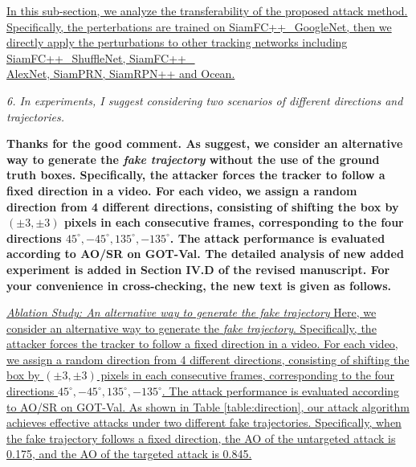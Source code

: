 \documentclass[12pt]{article}
\begin{document}
\uline{In this sub-section, we analyze the transferability of the proposed attack method. Specifically, the perterbations are trained on SiamFC++\_GoogleNet, then we directly apply the perturbations to other tracking networks including SiamFC++\_ShuffleNet, SiamFC++\_\\AlexNet, SiamPRN, SiamRPN++ and Ocean.}

\textit{6. In experiments, I suggest considering two scenarios of different directions and trajectories.}

\textbf{Thanks for the good comment. As suggest, we consider an alternative way to generate the \textit{fake trajectory} without the use of the ground truth boxes. Specifically, the attacker forces the tracker to follow a fixed direction in a video. For each video, we assign a random direction from 4 different directions, consisting of shifting the box by $(\pm 3, \pm 3)$ pixels in each consecutive frames, corresponding to the four directions $45^{\circ}, -45^{\circ}, 135^{\circ}, -135^{\circ}$.
The attack performance is evaluated according to AO/SR on GOT-Val.
The detailed analysis of new added experiment is added in Section IV.D of the revised manuscript. For your convenience in cross-checking, the new text is given as follows.}

\uline{\textit{Ablation Study: An alternative way to generate the fake trajectory} Here, we consider an alternative way to generate the \textit{fake trajectory}. Specifically, the attacker forces the tracker to follow a fixed direction in a video. For each video, we assign a random direction from 4 different directions, consisting of shifting the box by $(\pm 3, \pm 3)$ pixels in each consecutive frames, corresponding to the four directions $45^{\circ}, -45^{\circ}, 135^{\circ}, -135^{\circ}$.
The attack performance is evaluated according to AO/SR on GOT-Val.
As shown in Table \ref{table:direction}, our attack algorithm achieves effective attacks under two different fake trajectories. Specifically, when the fake trajectory follows a fixed direction, the AO of the untargeted attack is 0.175, and the AO of the targeted attack is 0.845.}
\end{document}
